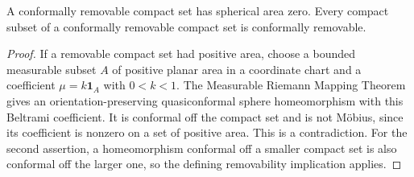 \begin{lemma}\label{lem:null-area}
A conformally removable compact set has spherical area zero.
Every compact subset of a conformally removable compact set is
conformally removable.
\end{lemma}

\begin{proof}
If a removable compact set had positive area, choose a bounded
measurable subset $A$ of positive planar area in a coordinate chart
and a coefficient $\mu=k\mathbf1_A$ with $0<k<1$.  The Measurable
Riemann Mapping Theorem \cite{Ahlfors2006} gives an
orientation-preserving quasiconformal sphere homeomorphism with this
Beltrami coefficient.  It is conformal off the compact set and is not
M\"obius, since its coefficient is nonzero on a set of positive area.
This is a contradiction.  For the second assertion, a homeomorphism
conformal off a smaller compact set is also conformal off the larger
one, so the defining removability implication applies.
\end{proof}
